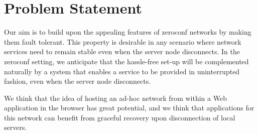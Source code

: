 \section{Problem Statement}
\label{sec:motivating_example}





Our aim is to build upon the appealing features of zeroconf networks by making them fault tolerant.
This property is desirable in any scenario where network services need to remain stable even when the server node disconnects.
In the zeroconf setting, we anticipate that the hassle-free set-up will be complemented naturally by a system that enables a service to be provided in uninterrupted fashion, even when the server node disconnects.

We think that the idea of hosting an ad-hoc network from within a Web application in the browser has great potential, and we think that applications for this network can benefit from graceful recovery upon disconnection of local servers.


